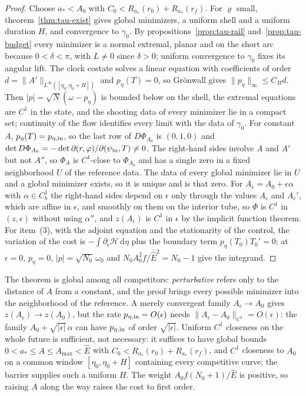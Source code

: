 \documentclass[aip,jmp,amsmath,amssymb,reprint]{revtex4-2}
\newcommand{\Ehat}{\hat E}
\newcommand{\dd}{\mathrm{d}}
\theoremstyle{plain}
\theoremstyle{definition}
\begin{document}
\begin{proof}
Choose $a_*<A_0$ with $C_0<R_{a_*}(r_0)+R_{a_*}(r_f)$. For $\varrho$ small, theorem~\ref{thm:tau-exist}
gives global minimizers, a uniform shell and a uniform duration $H$, and convergence to
$\gamma_0$. By propositions~\ref{prop:tau-rail} and~\ref{prop:tau-budget} every minimizer is a normal extremal, planar and
on the short arc because $0<\delta<\pi$, with $L\neq0$ since $\delta>0$; uniform convergence to $\gamma_0$ fixes
its angular lift. The clock costate solves a linear equation with coefficients of order
$d=\|A'\|_{L^\infty([\eta_0,\eta_0+H])}$ and $p_\eta(T)=0$, so Gr\"onwall gives $\|p_\eta\|_\infty\le C_Hd$.
Then $|p|=\sqrt N(\omega-p_\eta)$ is bounded below on the shell, the extremal equations are $C^1$ in
the state, and the shooting data of every minimizer lie in a compact set; continuity of
the flow identifies every limit with the data of $\gamma_0$. For constant $A$, $p_\eta(T)=p_{\eta,{\rm in}}$,
so the last row of $D\Phi_{A_0}$ is $(0,1,0)$ and
$\det D\Phi_{A_0}=-\det\partial(r,\varphi)/\partial(\psi_{\rm in},T)\neq0$. The right-hand sides
involve $A$ and $A'$ but not $A''$, so $\Phi_A$ is $C^1$-close to $\Phi_{A_0}$ and has a single
zero in a fixed neighborhood $U$ of the reference data. The data of every global minimizer
lie in $U$ and a global minimizer exists, so it is unique and is that zero. For $A_\epsilon=A_0+\epsilon\alpha$ with
$\alpha\in C^1_b$ the right-hand sides depend on $\epsilon$ only through the values $A_\epsilon$ and $A_\epsilon'$, which are affine
in $\epsilon$, and smoothly on them on the interior tube, so $\Phi$ is $C^1$ in $(z,\epsilon)$ without using $\alpha''$, and $z(A_\epsilon)$ is $C^1$ in $\epsilon$ by the implicit function theorem. For
item~(3),
with the adjoint equation and the stationarity of the control, the variation of the cost
is $-\int\partial_\epsilon\mathcal H\,\dd\eta$ plus the boundary term $p_\eta(T_0)T_0'=0$; at $\epsilon=0$,
$p_\eta=0$, $|p|=\sqrt{N_0}\,\omega_0$ and $N_0A_0^2f/\Ehat^2=N_0-1$ give the integrand.
\end{proof}

The theorem is global among all competitors: \emph{perturbative} refers only to the
distance of $A$ from a constant, and the proof brings every possible minimizer into the
neighborhood of the reference. A merely convergent family $A_\epsilon\to A_0$ gives
$z(A_\epsilon)\to z(A_0)$, but the rate $p_{\eta,{\rm in}}=O(\epsilon)$ needs
$\|A_\epsilon-A_0\|_{C^1}=O(\epsilon)$: the family $A_0+\sqrt{|\epsilon|}\,\alpha$ can have $p_{\eta,{\rm in}}$ of
order $\sqrt{|\epsilon|}$. Uniform $C^1$ closeness on the whole future is sufficient, not
necessary: it suffices to have global bounds $0<a_*\le A\le A_{\max}<\Ehat$ with
$C_0<R_{a_*}(r_0)+R_{a_*}(r_f)$, and $C^1$ closeness to $A_0$ on a common window
$[\eta_0,\eta_0+H]$ containing every competitive curve; the barrier supplies such a uniform
$H$. The weight
$A_0f(N_0+1)/\Ehat$ is positive, so raising $A$ along the way raises the cost to first order.
\end{document}
